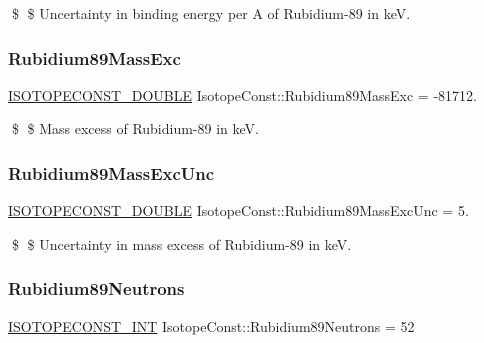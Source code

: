 \$ \$ Uncertainty in binding energy per A of Rubidium-\/89 in keV. \mbox{\label{group___isotope_const-_rubidium-_rb89_gac2be8a76602d67287d9319547ed3b7f2}} 
\subsubsection{\texorpdfstring{Rubidium89\+Mass\+Exc}{Rubidium89MassExc}}
{\footnotesize\ttfamily \mbox{\hyperlink{group___isotope_const-_macros_ga8f45a7272ce02c0b4c65c44636ed719a}{I\+S\+O\+T\+O\+P\+E\+C\+O\+N\+S\+T\+\_\+\+D\+O\+U\+B\+LE}} Isotope\+Const\+::\+Rubidium89\+Mass\+Exc = -\/81712.}

\$ \$ Mass excess of Rubidium-\/89 in keV. \mbox{\label{group___isotope_const-_rubidium-_rb89_gacd1630a53d981a9ee8a3d2732ff4940b}} 
\subsubsection{\texorpdfstring{Rubidium89\+Mass\+Exc\+Unc}{Rubidium89MassExcUnc}}
{\footnotesize\ttfamily \mbox{\hyperlink{group___isotope_const-_macros_ga8f45a7272ce02c0b4c65c44636ed719a}{I\+S\+O\+T\+O\+P\+E\+C\+O\+N\+S\+T\+\_\+\+D\+O\+U\+B\+LE}} Isotope\+Const\+::\+Rubidium89\+Mass\+Exc\+Unc = 5.}

\$ \$ Uncertainty in mass excess of Rubidium-\/89 in keV. \mbox{\label{group___isotope_const-_rubidium-_rb89_ga145860715b133f1510f7f5de0f035108}} 
\subsubsection{\texorpdfstring{Rubidium89\+Neutrons}{Rubidium89Neutrons}}
{\footnotesize\ttfamily \mbox{\hyperlink{group___isotope_const-_macros_ga5f18360b3e99483a35c32d789e62621c}{I\+S\+O\+T\+O\+P\+E\+C\+O\+N\+S\+T\+\_\+\+I\+NT}} Isotope\+Const\+::\+Rubidium89\+Neutrons = 52}

